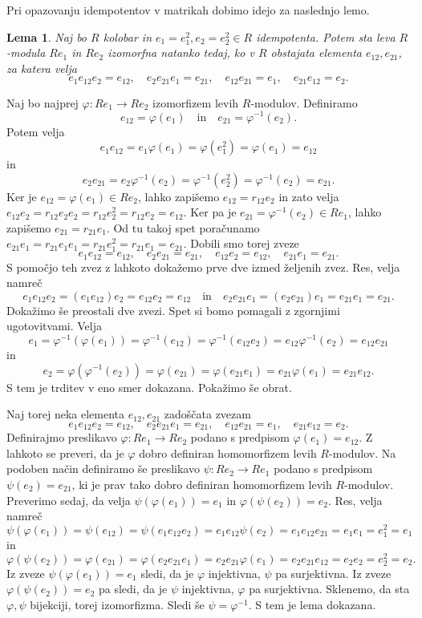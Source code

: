 \documentclass[a4paper, 12pt]{amsart}
\theoremstyle{definition} %
\theoremstyle{plain} %
\newtheorem{lema}[definicija]{Lema}
\begin{document}
Pri opazovanju idempotentov v matrikah dobimo idejo za naslednjo lemo.

\begin{lema}
\label{izomorfniPodmoduliElementi}
Naj bo $R$ kolobar in $e_1 = e_1^2 , e_2=e_2^2\in R$ idempotenta. Potem sta leva $R$-modula $Re_1$ in $Re_2$ izomorfna natanko tedaj, ko v $R$ obstajata elementa $e_{12}, e_{21}$, za katera velja
$$
e_1 e_{12} e_2 = e_{12}, \quad e_2 e_{21} e_1 = e_{21}, \quad e_{12}e_{21} = e_1, \quad e_{21}e_{12} = e_2.
$$
\end{lema}

\proof
Naj bo najprej $\varphi : Re_1 \rightarrow Re_2$ izomorfizem levih $R$-modulov. Definiramo 
$$
e_{12} = \varphi(e_1) \quad \text{in} \quad e_{21} = \varphi^{-1}(e_2).
$$
Potem velja 
$$
e_1 e_{12} = e_1\varphi(e_1) = \varphi(e_1^2) = \varphi(e_1) = e_{12}
$$
in
$$
e_2 e_{21} = e_2\varphi^{-1}(e_2) = \varphi^{-1}(e_2^2) = \varphi^{-1}(e_2) = e_{21}.
$$
Ker je $e_{12} = \varphi (e_1) \in Re_2$, lahko zapišemo $e_{12} = r_{12}e_2$ in zato velja $e_{12}e_2 = r_{12}e_2 e_2 = r_{12}e_2^2 = r_{12}e_2 = e_{12}$. Ker pa je $e_{21} = \varphi^{-1}(e_2) \in Re_1$, lahko zapišemo $e_{21} = r_{21}e_1$. Od tu takoj spet poračunamo $e_{21}e_1 = r_{21}e_1e_1 = r_{21}e_1^2 = r_{21}e_1=e_{21}$. Dobili smo torej zveze
$$
e_1e_{12} = e_{12},\quad  e_2 e_{21} = e_{21}, \quad e_{12} e_2 = e_{12}, \quad e_{21} e_1 = e_{21}.
$$
S pomočjo teh zvez z lahkoto dokažemo prve dve izmed željenih zvez. Res, velja namreč 
$$
e_1 e_{12} e_2 = (e_1 e_{12}) e_2 = e_{12} e_2 = e_{12}\quad \text{in}\quad e_2 e_{21}e_1 = (e_2 e_{21}) e_1 = e_{21}e_1 = e_{21}.
$$
Dokažimo še preostali dve zvezi. Spet si bomo pomagali z zgornjimi ugotovitvami. Velja
$$
e_1 = \varphi^{-1}(\varphi(e_1)) = \varphi^{-1}(e_{12}) = \varphi^{-1}(e_{12} e_2) = e_{12} \varphi^{-1}(e_2) = e_{12} e_{21}
$$
in
$$
e_2 = \varphi(\varphi^{-1}(e_2)) = \varphi(e_{21}) = \varphi(e_{21}e_1)=e_{21}\varphi(e_1) = e_{21} e_{12}.
$$
S tem je trditev v eno smer dokazana. Pokažimo še obrat.

Naj torej neka elementa $e_{12}, e_{21}$ zadoščata zvezam
$$
e_1 e_{12} e_2 = e_{12}, \quad e_2 e_{21} e_1 = e_{21}, \quad e_{12}e_{21} = e_1, \quad e_{21}e_{12} = e_2.
$$
Definirajmo preslikavo $\varphi : Re_1 \rightarrow Re_2$ podano s predpisom $\varphi(e_1) = e_{12}$. Z lahkoto se preveri, da je $\varphi$ dobro definiran homomorfizem levih $R$-modulov. Na podoben način definiramo še preslikavo $\psi:Re_2 \rightarrow Re_1$ podano s predpisom $\psi(e_2) = e_{21}$, ki je prav tako dobro definiran homomorfizem levih $R$-modulov.
Preverimo sedaj, da velja $\psi(\varphi(e_1)) = e_1$ in $\varphi(\psi(e_2)) = e_2$. Res, velja namreč
$$
\psi(\varphi(e_1)) = \psi(e_{12}) = \psi(e_1 e_{12}e_2) = e_1 e_{12}\psi(e_2) = e_1 e_{12} e_{21} = e_1 e_1 = e_1^2 = e_1
$$
in
$$
\varphi(\psi(e_2)) = \varphi(e_{21}) = \varphi(e_2 e_{21} e_1) = e_2 e_{21} \varphi(e_1) = e_2 e_{21} e_{12} = e_2 e_2 = e_2^2 = e_2. 
$$
Iz zveze $\psi(\varphi(e_1)) = e_1$ sledi, da je $\varphi$ injektivna, $\psi$ pa surjektivna. Iz zveze $\varphi(\psi(e_2)) = e_2$ pa sledi, da je $\psi$ injektivna, $\varphi$ pa surjektivna. Sklenemo, da sta $\varphi, \psi$ bijekciji, torej izomorfizma. Sledi še $\psi = \varphi^{-1}$. S tem je lema dokazana.
\endproof
\end{document}
